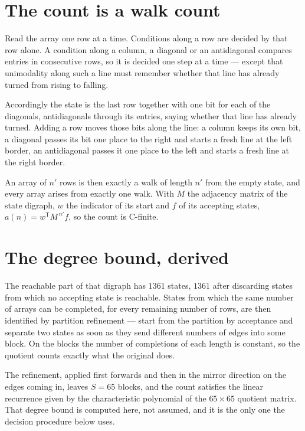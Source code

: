 \documentclass[11pt]{article}
\theoremstyle{definition}
\begin{document}
\section{The count is a walk count}

Read the array one row at a time. Conditions along a row are decided by that row alone. A condition along a column, a diagonal or an antidiagonal compares entries in consecutive rows, so it is decided one step at a time --- except that unimodality along such a line must remember whether that line has already turned from rising to falling.

Accordingly the state is the last row together with one bit for each of the diagonals, antidiagonals through its entries, saying whether that line has already turned. Adding a row moves those bits along the line: a column keeps its own bit, a diagonal passes its bit one place to the right and starts a fresh line at the left border, an antidiagonal passes it one place to the left and starts a fresh line at the right border.

An array of $n'$ rows is then exactly a walk of length $n'$ from the empty state, and every array arises from exactly one walk. With $M$ the adjacency matrix of the state digraph, $w$ the indicator of its start and $f$ of its accepting states, $a(n) = w^{\mathsf T}M^{\,n'}f$, so the count is C-finite.

\section{The degree bound, derived}

The reachable part of that digraph has $1361$ states, $1361$ after discarding states from which no accepting state is reachable. States from which the same number of arrays can be completed, for every remaining number of rows, are then identified by partition refinement --- start from the partition by acceptance and separate two states as soon as they send different numbers of edges into some block. On the blocks the number of completions of each length is constant, so the quotient counts exactly what the original does.

The refinement, applied first forwards and then in the mirror direction on the edges coming in, leaves $S = 65$ blocks, and the count satisfies the linear recurrence given by the characteristic polynomial of the $65 \times 65$ quotient matrix. That degree bound is computed here, not assumed, and it is the only one the decision procedure below uses.
\end{document}
